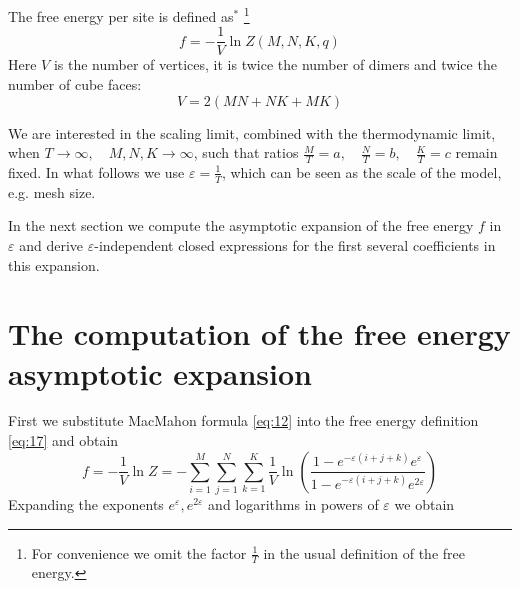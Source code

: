 \documentclass{article}
\begin{document}
The   free energy per site is defined as$^{*}$
\footnote{For convenience we omit the factor $\frac{1}{T}$ in the usual definition of the free energy.}
\begin{equation*}
  \label{eq:17}
  f=-\frac{1}{V}\ln Z(M,N,K,q)
\end{equation*}
Here $V$ is the number of vertices, it is twice the number of dimers and twice the number of  cube faces:
\begin{equation*}
  \label{eq:19}
  V=2(MN+NK+MK)
\end{equation*}

  
We are interested in the scaling limit, combined with the thermodynamic limit, when
$ T\to \infty, \quad M,N,K\to \infty$, such that ratios
$\frac{M}{T}=a,\quad \frac{N}{T}=b, \quad \frac{K}{T}=c$ remain fixed. In what follows we use
$\varepsilon=\frac{1}{T}$, which can be seen as the scale of the model, e.g. mesh size.

In the next section we compute the asymptotic expansion of the free energy $f$ in $\varepsilon$ and
derive $\varepsilon$-independent closed expressions for the first several coefficients in this
expansion.
  
\section{The computation of the free energy asymptotic expansion}
\label{sec:free-energy-scaling}
First we substitute MacMahon formula \eqref{eq:12} into the free energy definition \eqref{eq:17} and
obtain
\begin{equation}
  \label{eq:20}
    f=-\frac{1}{V}\ln Z =- \sum_{i=1}^{M} \sum_{j=1}^{N} \sum_{k=1}^{K} \frac{1}{V}
  \ln\left(\frac{1-e^{-\varepsilon (i+j+k)} e^{\varepsilon}}{1-e^{-\varepsilon (i+j+k)} e^{2\varepsilon}}\right)
\end{equation}
Expanding the exponents $e^{\varepsilon}, e^{2\varepsilon}$ and logarithms in powers of $\varepsilon$ we obtain
\end{document}
